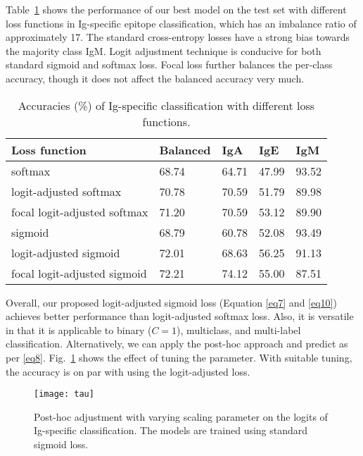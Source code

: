 \documentclass[runningheads]{llncs}
\begin{document}
Table~\ref{tab3} shows the performance of our best model on the test set with different loss functions in Ig-specific epitope classification, which has an imbalance ratio of approximately 17. The standard cross-entropy losses have a strong bias towards the majority class IgM. Logit adjustment technique is conducive for both standard sigmoid and softmax loss. Focal loss further balances the per-class accuracy, though it does not affect the balanced accuracy very much.
\begin{table}[htbp]
\caption{Accuracies (\%) of Ig-specific classification with different loss functions.}
\begin{center}
\begin{tabular}{l|l|l|l|l}
\hline
Loss function & Balanced & IgA & IgE & IgM \\
\hline
softmax & 68.74 & 64.71 & 47.99 & 93.52 \\
logit-adjusted softmax & 70.78 & 70.59 & 51.79 & 89.98 \\
focal logit-adjusted softmax & 71.20 & 70.59 & 53.12 & 89.90 \\
sigmoid & 68.79 & 60.78 & 52.08 & 93.49 \\
logit-adjusted sigmoid & 72.01 & 68.63 & 56.25 & 91.13 \\
focal logit-adjusted sigmoid & 72.21 & 74.12 & 55.00 & 87.51 \\
\hline
\end{tabular}
\label{tab3}
\end{center}
\end{table}
Overall, our proposed logit-adjusted sigmoid loss (Equation \eqref{eq7} and \eqref{eq10}) achieves better performance than logit-adjusted softmax loss. Also, it is versatile in that it is applicable to binary ($C=1$), multiclass, and multi-label classification. Alternatively, we can apply the post-hoc approach and predict as per \eqref{eq8}. Fig.~\ref{fig2} shows the effect of tuning the parameter. With suitable tuning, the accuracy is on par with using the logit-adjusted loss.
\begin{figure}[htbp]
\centerline{\texttt{[image: tau]}}
\caption{Post-hoc adjustment with varying scaling parameter on the logits of Ig-specific classification. The models are trained using standard sigmoid loss.}
\label{fig2}
\end{figure}
\end{document}
